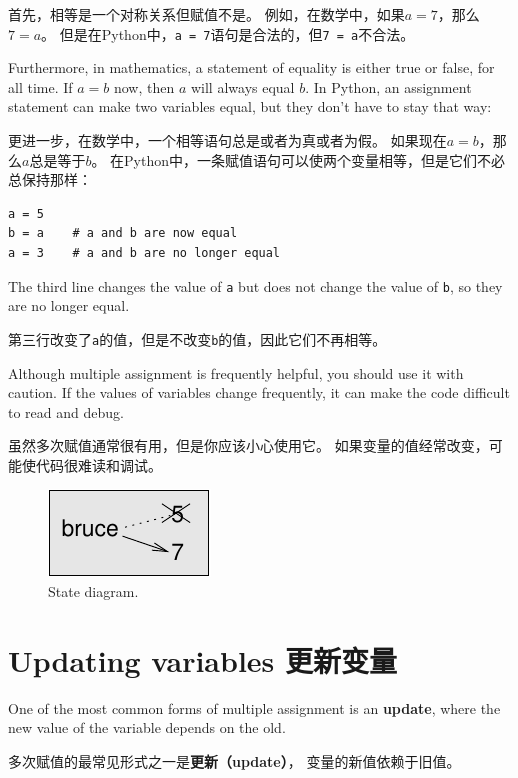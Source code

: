 \documentclass[10pt]{book}
\begin{document}
\begin{CJK}{UTF8}{gbsn}
首先，相等是一个对称关系但赋值不是。
例如，在数学中，如果$a=7$，那么$7=a$。
但是在Python中，{\tt a = 7}语句是合法的，但{\tt 7 = a}不合法。 

Furthermore, in mathematics, a statement of equality is either true or
false, for all time.  If $a=b$ now, then $a$ will always equal $b$.
In Python, an assignment statement can make two variables equal, but
they don't have to stay that way:

更进一步，在数学中，一个相等语句总是或者为真或者为假。
如果现在$a=b$，那么$a$总是等于$b$。
在Python中，一条赋值语句可以使两个变量相等，但是它们不必总保持那样：

\begin{verbatim}
a = 5
b = a    # a and b are now equal
a = 3    # a and b are no longer equal
\end{verbatim}
%
The third line changes the value of {\tt a} but does not change the
value of {\tt b}, so they are no longer equal. 

第三行改变了{\tt a}的值，但是不改变{\tt b}的值，因此它们不再相等。

Although multiple assignment is frequently helpful, you should use it
with caution.  If the values of variables change frequently, it can
make the code difficult to read and debug.

虽然多次赋值通常很有用，但是你应该小心使用它。
如果变量的值经常改变，可能使代码很难读和调试。

\begin{figure}
\centerline
{\includegraphics[scale=0.8]{figs/assign2.pdf}}
\caption{State diagram.}
\label{fig.assign2}
\end{figure}



\section{Updating variables 更新变量}
\label{update}


One of the most common forms of multiple assignment is an {\bf update},
where the new value of the variable depends on the old.

多次赋值的最常见形式之一是{\bf 更新（update）}，
变量的新值依赖于旧值。


\end{CJK}
\end{document}
